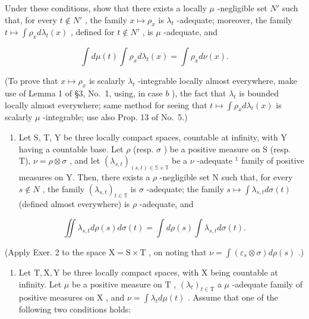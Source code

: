 Under these conditions, show that there exists a locally \(\mu\) -negligible set \(N'\) such that, for every \(t \notin N'\) , the family \(x \mapsto \rho_x\) is \(\lambda_t\) -adequate; moreover, the family \(t \mapsto \int \rho_x d\lambda_t(x)\) , defined for \(t \notin N'\) , is \(\mu\) -adequate, and

\[
\int d \mu (t) \int \rho_ {x} d \lambda_ {t} (x) = \int \rho_ {x} d \nu (x).
\]

(To prove that \(x \mapsto \rho_x\) is scalarly \(\lambda_t\) -integrable locally almost everywhere, make use of Lemma 1 of §3, No.~1, using, in case \(b\) ), the fact that \(\lambda_t\) is bounded locally almost everywhere; same method for seeing that \(t \mapsto \int \rho_x d\lambda_t(x)\) is scalarly \(\mu\) -integrable; use also Prop. 13 of No.~5.)

\begin{enumerate}
\def\labelenumi{\arabic{enumi})}
\setcounter{enumi}{2}
\tightlist
\item
  Let S, T, Y be three locally compact spaces, countable at infinity, with Y having a countable base. Let \(\rho\) (resp. \(\sigma\) ) be a positive measure on S (resp. T), \(\nu = \rho \otimes \sigma\) , and let \((\lambda_{s,t})_{(s,t) \in \mathbb{S} \times \mathbb{T}}\) be a \(\nu\) -adequate \(^{1}\) family of positive measures on Y. Then, there exists a \(\rho\) -negligible set N such that, for every \(s \notin N\) , the family \((\lambda_{s,t})_{t \in \mathbb{T}}\) is \(\sigma\) -adequate; the family \(s \mapsto \int \lambda_{s,t} d\sigma(t)\) (defined almost everywhere) is \(\rho\) -adequate, and
\end{enumerate}

\[
\iint \lambda_ {s, t} d \rho (s) d \sigma (t) = \int d \rho (s) \int \lambda_ {s, t} d \sigma (t).
\]

(Apply Exer. 2 to the space \(\mathrm{X} = \mathrm{S} \times \mathrm{T}\) , on noting that \(\nu = \int (\varepsilon_s \otimes \sigma) d\rho(s)\) .)

\begin{enumerate}
\def\labelenumi{\arabic{enumi})}
\setcounter{enumi}{3}
\tightlist
\item
  Let \(\mathrm{T}, \mathrm{X}, \mathrm{Y}\) be three locally compact spaces, with \(\mathrm{X}\) being countable at infinity. Let \(\mu\) be a positive measure on \(\mathrm{T}\) , \((\lambda_t)_{t \in \mathrm{T}}\) a \(\mu\) -adequate family of positive measures on \(\mathrm{X}\) , and \(\nu = \int \lambda_t d\mu(t)\) . Assume that one of the following two conditions holds:
\end{enumerate}

